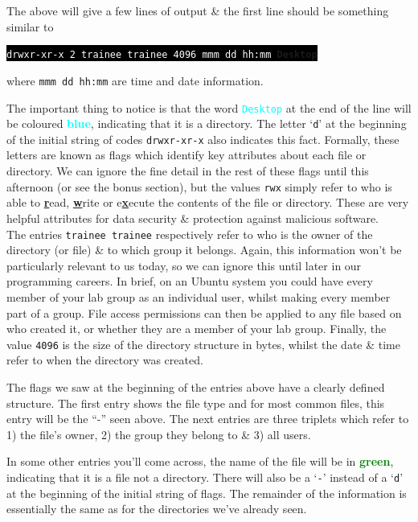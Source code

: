 The above will give a few lines of output \& the first line should be something similar to
\begin{center}
\colorbox{black}{\texttt{\textcolor{white}{drwxr-xr-x 2 trainee trainee 4096 mmm dd hh:mm} \textcolor{light-blue}{\textbf{Desktop}}}}\\
\end{center}
where \texttt{mmm dd hh:mm} are time and date information.\\

\begin{information}
The important thing to notice is that the word \textcolor{cyan}{\texttt{Desktop}} at the end of the line will be coloured \textcolor{cyan}{\textbf{blue}}, indicating that it is a directory.
The letter `\texttt{d}' at the beginning of the initial string of codes \texttt{drwxr-xr-x} also indicates this fact.
Formally, these letters are known as flags which identify key attributes about each file or directory.
We can ignore the fine detail in the rest of these flags until this afternoon (or see the bonus section), but the values \texttt{rwx} simply refer to who is able to \textbf{\underline{r}}ead, \textbf{\underline{w}}rite or e\textbf{\underline{x}}ecute the contents of the file or directory. 
These are very helpful attributes for data security \& protection against malicious software.\\

The entries \texttt{trainee trainee} respectively refer to who is the owner of the directory (or file) \& to which group it belongs.
Again, this information won't be particularly relevant to us today, so we can ignore this until later in our programming careers.
In brief, on an Ubuntu system you could have every member of your lab group as an individual user, whilst making every member part of a group.
File access permissions can then be applied to any file based on who created it, or whether they are a member of your lab group.
Finally, the value \texttt{4096} is the size of the directory structure in bytes, whilst the date \& time refer to when the directory was created.\\

\begin{bonus}
The flags we saw at the beginning of the entries above have a clearly defined structure. 
The first entry shows the file type and for most common files, this entry will be the ``-'' seen above.
The next entries are three triplets which refer to 1) the file's owner, 2) the group they belong to \& 3) all users.
\end{bonus}

In some other entries you'll come across, the name of the file will be in \textcolor{green}{\textbf{green}}, indicating that it is a file not a directory.
There will also be a `\texttt{-}' instead of a `\texttt{d}' at the beginning of the initial string of flags. 
The remainder of the information is essentially the same as for the directories we've already seen.\\
\end{information}

